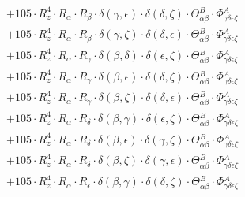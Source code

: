 \documentclass{article}
\begin{document}
\begin{equation}
\begin{array}{c}
 \\[0.2em] 		 + 105 \cdot R_{z}^{4} \cdot R_{\alpha{}} \cdot R_{\beta{}} \cdot \delta{}\left(\gamma{}, \epsilon{}\right) \cdot \delta{}\left(\delta{}, \zeta{}\right) \cdot \Theta{}^{B}_{\alpha{}\beta{}} \cdot \Phi{}^{A}_{\gamma{}\delta{}\epsilon{}\zeta{}} 
 \\[0.2em] 		 + 105 \cdot R_{z}^{4} \cdot R_{\alpha{}} \cdot R_{\beta{}} \cdot \delta{}\left(\gamma{}, \zeta{}\right) \cdot \delta{}\left(\delta{}, \epsilon{}\right) \cdot \Theta{}^{B}_{\alpha{}\beta{}} \cdot \Phi{}^{A}_{\gamma{}\delta{}\epsilon{}\zeta{}} 
 \\[0.2em] 		 + 105 \cdot R_{z}^{4} \cdot R_{\alpha{}} \cdot R_{\gamma{}} \cdot \delta{}\left(\beta{}, \delta{}\right) \cdot \delta{}\left(\epsilon{}, \zeta{}\right) \cdot \Theta{}^{B}_{\alpha{}\beta{}} \cdot \Phi{}^{A}_{\gamma{}\delta{}\epsilon{}\zeta{}} 
 \\[0.2em] 		 + 105 \cdot R_{z}^{4} \cdot R_{\alpha{}} \cdot R_{\gamma{}} \cdot \delta{}\left(\beta{}, \epsilon{}\right) \cdot \delta{}\left(\delta{}, \zeta{}\right) \cdot \Theta{}^{B}_{\alpha{}\beta{}} \cdot \Phi{}^{A}_{\gamma{}\delta{}\epsilon{}\zeta{}} 
 \\[0.2em] 		 + 105 \cdot R_{z}^{4} \cdot R_{\alpha{}} \cdot R_{\gamma{}} \cdot \delta{}\left(\beta{}, \zeta{}\right) \cdot \delta{}\left(\delta{}, \epsilon{}\right) \cdot \Theta{}^{B}_{\alpha{}\beta{}} \cdot \Phi{}^{A}_{\gamma{}\delta{}\epsilon{}\zeta{}} 
 \\[0.2em] 		 + 105 \cdot R_{z}^{4} \cdot R_{\alpha{}} \cdot R_{\delta{}} \cdot \delta{}\left(\beta{}, \gamma{}\right) \cdot \delta{}\left(\epsilon{}, \zeta{}\right) \cdot \Theta{}^{B}_{\alpha{}\beta{}} \cdot \Phi{}^{A}_{\gamma{}\delta{}\epsilon{}\zeta{}} 
 \\[0.2em] 		 + 105 \cdot R_{z}^{4} \cdot R_{\alpha{}} \cdot R_{\delta{}} \cdot \delta{}\left(\beta{}, \epsilon{}\right) \cdot \delta{}\left(\gamma{}, \zeta{}\right) \cdot \Theta{}^{B}_{\alpha{}\beta{}} \cdot \Phi{}^{A}_{\gamma{}\delta{}\epsilon{}\zeta{}} 
 \\[0.2em] 		 + 105 \cdot R_{z}^{4} \cdot R_{\alpha{}} \cdot R_{\delta{}} \cdot \delta{}\left(\beta{}, \zeta{}\right) \cdot \delta{}\left(\gamma{}, \epsilon{}\right) \cdot \Theta{}^{B}_{\alpha{}\beta{}} \cdot \Phi{}^{A}_{\gamma{}\delta{}\epsilon{}\zeta{}} 
 \\[0.2em] 		 + 105 \cdot R_{z}^{4} \cdot R_{\alpha{}} \cdot R_{\epsilon{}} \cdot \delta{}\left(\beta{}, \gamma{}\right) \cdot \delta{}\left(\delta{}, \zeta{}\right) \cdot \Theta{}^{B}_{\alpha{}\beta{}} \cdot \Phi{}^{A}_{\gamma{}\delta{}\epsilon{}\zeta{}} 

\end{array}
\end{equation}
\end{document}
